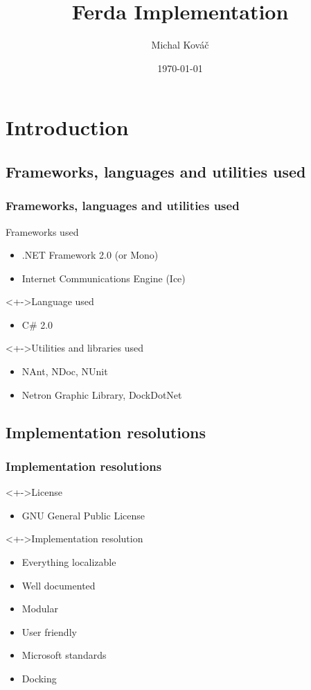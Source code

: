 \documentclass[handout]{beamer}
\title{Ferda Implementation}
\author{Michal Kov\'{a}\v{c}}
\date{\today}
\begin{document}
\frame{\titlepage}

\section{Introduction}

\subsection{Frameworks, languages and utilities used}
\begin{frame}
	\frametitle{Frameworks, languages and utilities used}
	\begin{block}{Frameworks used}
		\begin{itemize}[<+->]
			\item .NET Framework 2.0 (or Mono)
			\item Internet Communications Engine (Ice)
		\end{itemize}
	\end{block}
	\begin{block}<+->{Language used}
		\begin{itemize}
			\item C\# 2.0
		\end{itemize}
	\end{block}
	\begin{block}<+->{Utilities and libraries used}
		\begin{itemize}[<+->]
			\item NAnt, NDoc, NUnit
			\item Netron Graphic Library, DockDotNet
		\end{itemize}
	\end{block}
\end{frame}

\subsection{Implementation resolutions}
\begin{frame}
	\frametitle{Implementation resolutions}
	\begin{block}<+->{License}
		\begin{itemize}
			\item GNU General Public License
		\end{itemize}
	\end{block}
	\begin{block}<+->{Implementation resolution}
		\begin{itemize}[<+->]
			\item Everything localizable 
			\item Well documented
			\item Modular
			\item User friendly
			\item Microsoft standards
			\item Docking
		\end{itemize}
	\end{block}	
\end{frame}
\end{document}
